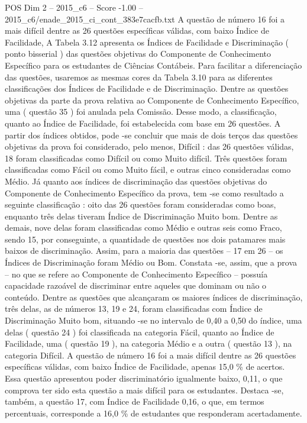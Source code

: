 \begin{textsample}{POS Dim 2 – 2015\_c6 – Score -1.00 – 2015\_c6/enade\_2015\_ci\_cont\_383e7cacfb.txt}
A questão de número 16 foi a mais difícil dentre as 26 questões específicas válidas, com baixo Índice de Facilidade, A Tabela 3.12 apresenta os Índices de Facilidade e Discriminação ( ponto bisserial ) das questões objetivas do Componente de Conhecimento Específico para os estudantes de Ciências Contábeis.
Para facilitar a diferenciação das questões, usaremos as mesmas cores da Tabela 3.10 para as diferentes classificações dos Índices de Facilidade e de Discriminação.
Dentre as questões objetivas da parte da prova relativa ao Componente de Conhecimento Específico, uma ( questão 35 ) foi anulada pela Comissão.
Desse modo, a classificação, quanto ao Índice de Facilidade, foi estabelecida com base em 26 questões.
A partir dos índices obtidos, pode -se concluir que mais de dois terços das questões objetivas da prova foi considerado, pelo menos, Difícil : das 26 questões válidas, 18 foram classificadas como Difícil ou como Muito difícil.
Três questões foram classificadas como Fácil ou como Muito fácil, e outras cinco consideradas como Médio.
Já quanto aos índices de discriminação das questões objetivas do Componente de Conhecimento Específico da prova, tem -se como resultado a seguinte classificação : oito das 26 questões foram consideradas como boas, enquanto três delas tiveram Índice de Discriminação Muito bom.
Dentre as demais, nove delas foram classificadas como Médio e outras seis como Fraco, sendo 15, por conseguinte, a quantidade de questões nos dois patamares mais baixos de discriminação.
Assim, para a maioria das questões – 17 em 26 – os Índices de Discriminação foram Médio ou Bom.
Constata -se, assim, que a prova – no que se refere ao Componente de Conhecimento Específico – possuía capacidade razoável de discriminar entre aqueles que dominam ou não o conteúdo.
Dentre as questões que alcançaram os maiores índices de discriminação, três delas, as de números 13, 19 e 24, foram classificadas com Índice de Discriminação Muito bom, situando -se no intervalo de 0,40 a 0,50 do índice, uma delas ( questão 24 ) foi classificada na categoria Fácil, quanto ao Índice de Facilidade, uma ( questão 19 ), na categoria Médio e a outra ( questão 13 ), na categoria Difícil.
A questão de número 16 foi a mais difícil dentre as 26 questões específicas válidas, com baixo Índice de Facilidade, apenas 15,0 \% de acertos.
Essa questão apresentou poder discriminatório igualmente baixo, 0,11, o que comprova ter sido esta questão a mais difícil para os estudantes.
Destaca -se, também, a questão 17, com Índice de Facilidade 0,16, o que, em termos percentuais, corresponde a 16,0 \% de estudantes que responderam acertadamente.

\end{textsample}
